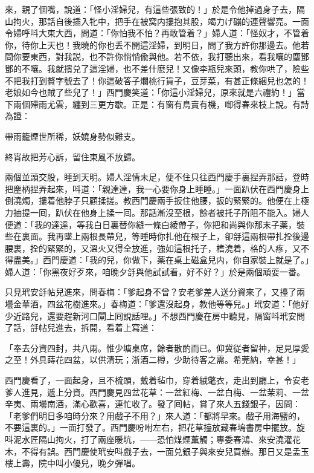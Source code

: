 來，親了個嘴，說道：「怪小淫婦兒，有這些張致的！」於是令他掉過身子去，隔山拘火，那話自後插入牝中，把手在被窝内摟抱其股，竭力げ磞的連聲響亮。一面令婦呼呌大東大西，問道：「你怕我不怕？再敢管着？」婦人道：「怪奴才，不管着你，待你上天也！我曉的你也丢不開這淫婦，到明日，問了我方許你那邊去。他若問你要東西，對我説，也不許你悄悄偸與他。若不依，我打聽出來，看我嚷的塵鄧鄧的不嚷。我就擯兑了這淫婦，也不差什麽兒！又像李瓶兒來頭，教你哄了，險些不把我打到贅字號去了！你這破答子爛桃行貨子，豆芽菜，有甚正條綑兒也怎的！老娘如今也賊了些兒了！」西門慶笑道：「你這小淫婦兒，原來就是六禮約！」當下兩個殢雨尤雲，纏到三更方歇。正是：有窗有鳥賣有機，啣得春來枝上說。有詩為證：

\begin{myquote}
帶雨籠煙世所稀，妖嬈身勢似難支。

終宵故把芳心訴，留住東風不放歸。
\end{myquote}

兩個並頭交股，睡到天明。婦人淫情未足，便不住只往西門慶手裏捏弄那話，登時把麈柄捏弄起來，呌道：「親達達，我一心要你身上睡睡。」一面趴伏在西門慶身上倒澆燭，摟着他脖子只顧揉搓。教西門慶兩手扳住他腰，扳的緊緊的。他便在上極力抽提一囘，趴伏在他身上揉一囘。那話漸沒至根，餘者被托子所阻不能入。婦人便道：「我的達達，等我白日裏替你縫一條白綾帶子，你把和尚與你那末子薬，裝些在裏面。我再墜上兩根長帶兒，等睡時你扎他在根子上，卻㧱這兩根帶扎拴後邊腰裏，拴的緊緊的，又溫火又得全放進，強如這根托子，榰澆着，格的人疼，又不得盡美。」西門慶道：「我的兒，你做下，薬在桌上磁盒兒内，你自家裝上就是了。」婦人道：「你黑夜好歹來，咱晚夕㧱與他試試看，好不好？」於是兩個頑耍一番。

只見玳安㧱帖兒進來，問春梅：「爹起身不曾？安老爹差人送分資來了，又擡了兩壜金華酒，四盆花樹進來。」春梅道：「爹還沒起身，教他等等兒。」玳安道：「他好少近路兒，還要趕新河口閘上囘說話哩。」不想西門慶在房中聽見，隔窗呌玳安問了話，㧱帖兒進去，拆開，看着上寫道：

\begin{myquote}
「奉去分資四封，共八兩。惟少塘桌席，餘者散酌而已。仰冀従者留神，足見厚愛之至！外具蒔花四盆，以供清玩；浙酒二樽，少助待客之需。希莞納，幸甚！」
\end{myquote}

西門慶看了，一面起身，且不梳頭，戴着毡巾，穿着絨氅衣，走出到廳上，令安老爹人進見，遞上分資。西門慶見四盆花草：一盆紅梅、一盆白梅、一盆茉莉、一盆辛夷、兩壜南酒，滿心歡喜，連忙收了。發了囘帖，賞了來人五錢銀子，因問：「老爹們明日多咱時分來？用戲子不用？」來人道：「都將早來。戲子用海鹽的，不要這裏的。」一面打發了。西門慶吩咐左右，把花草擡放藏春塢書房中擺放。旋呌泥水匠隔山拘火，打了兩座暖坑，——恐怕煤煙薰觸；專委春鴻、來安澆灌花木，不得有誤。西門慶使玳安呌戲子去，一面兑銀子與來安兒買辦。那日又是孟玉樓上壽，院中叫小優兒，晚夕彈唱。

